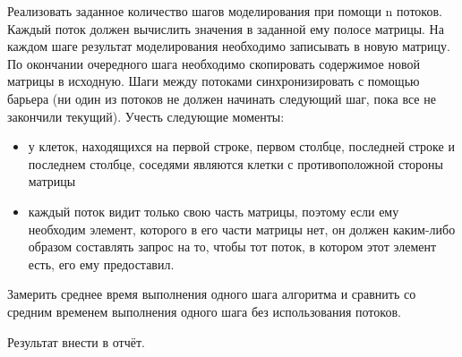 \documentclass[a4paper, 14pt]{extarticle}
\begin{document}
    
    Реализовать заданное количество шагов моделирования при помощи n потоков. Каждый поток должен вычислить значения в заданной ему полосе матрицы. На каждом шаге результат моделирования необходимо записывать в новую матрицу. По окончании очередного шага необходимо скопировать содержимое новой матрицы в исходную. Шаги между потоками синхронизировать с помощью барьера (ни один из потоков не должен начинать следующий шаг, пока все не закончили текущий). Учесть следующие моменты:

    
    \begin{itemize}
        \item у клеток, находящихся на первой строке, первом столбце, последней строке и последнем столбце, соседями являются клетки с противоположной стороны матрицы
        \item каждый поток видит только свою часть матрицы, поэтому если ему необходим элемент, которого в его части матрицы нет, он должен каким-либо образом составлять запрос на то, чтобы тот поток, в котором этот элемент есть, его ему предоставил.
    \end{itemize}

    
    Замерить среднее время выполнения одного шага алгоритма и сравнить со средним временем выполнения одного шага без использования потоков. 

    
    Результат внести в отчёт.
\end{document}
